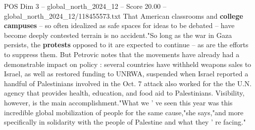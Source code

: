 \begin{textsample}{POS Dim 3 – global\_north\_2024\_12 – Score 20.00 – global\_north\_2024\_12/118455573.txt}
That American classrooms and \textbf{college} \textbf{campuses} -- so often idealized as safe spaces for ideas to be debated -- have become deeply contested terrain is no accident."So long as the war in Gaza persists, the \textbf{protests} opposed to it are expected to continue -- as are the efforts to suppress them.
But Petrovic notes that the movements have already had a demonstrable impact on policy : several countries have withheld weapons sales to Israel, as well as restored funding to UNRWA, suspended when Israel reported a handful of Palestinians involved in the Oct. 7 attack also worked for the the U.N. agency that provides health, education, and food aid to Palestinians.
Visibility, however, is the main accomplishment."What we ' ve seen this year was this incredible global mobilization of people for the same cause,"she says,"and more specifically in solidarity with the people of Palestine and what they ' re facing."

\end{textsample}
